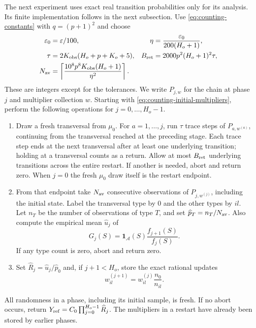 The next experiment uses exact real transition probabilities only for
its analysis.  Its finite implementation follows in the next subsection.
Use \eqref{eq:counting-constants} with $q=(p+1)^2$ and choose
\begin{equation}
 \begin{aligned}
 \varepsilon_0&=\varepsilon/100,
 &\eta&=\frac{\varepsilon_0}{200(H_o+1)},\\
 \tau&=2K_{\rm obs}(H_o+p+K_o+5),
 &B_{\rm ret}&=2000p^2(H_o+1)^2\tau,\\
 N_{\rm av}&=\left\lceil
       \frac{10^8p^8K_{\rm obs}(H_o+1)}{\eta^2}\right\rceil.
 \end{aligned}
 \label{eq:counting-caps}
\end{equation}
These are integers except for the tolerances.  We write $P_{j,w}$ for
the chain at phase $j$ and multiplier collection $w$.
Starting with \eqref{eq:counting-initial-multipliers}, perform the
following operations for $j=0,\ldots,H_o-1$.

\begin{enumerate}
\item Draw a fresh transversal from $\mu_0$.  For $a=1,\ldots,j$,
run $\tau$ trace steps of $P_{a,w^{(a)}}$, continuing from the
transversal reached at the preceding stage.  Each trace step ends at
the next transversal after at least one underlying transition;
holding at a transversal counts as a return.  Allow at most
$B_{\rm ret}$ underlying transitions across the entire restart.
If another is needed, abort and return zero.  When $j=0$ the fresh
$\mu_0$ draw itself is the restart endpoint.

\item From that endpoint take $N_{\rm av}$ consecutive observations
of $P_{j,w^{(j)}}$, including the initial state.  Label the transversal
type by $0$ and the other types by $il$.  Let $n_T$ be the number of
observations of type $T$, and set $\widehat p_T=n_T/N_{\rm av}$.
Also compute the empirical mean $\widehat u_j$ of
\[
 G_j(S)=\mathbf1_{\mathcal A}(S)\frac{f_{j+1}(S)}{f_j(S)}.
\]
If any type count is zero, abort and return zero.

\item Set $\widehat R_j=\widehat u_j/\widehat p_0$ and, if
$j+1<H_o$, store the exact rational updates
\begin{equation}
 w_{il}^{(j+1)}=w_{il}^{(j)}\frac{n_0}{n_{il}}.
 \label{eq:counting-update}
\end{equation}
\end{enumerate}
All randomness in a phase, including its initial sample, is fresh.
If no abort occurs, return
$Y_{\rm ref}=C_0\prod_{j=0}^{H_o-1}\widehat R_j$.
The multipliers in a restart have already been stored by earlier phases.

